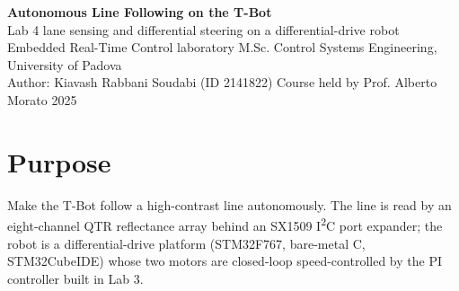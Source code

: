 \documentclass[10pt,a4paper]{article}
\begin{document}
\begin{center}
{\Large\bfseries Autonomous Line Following on the T-Bot}\\[2pt]
{\large Lab 4 \textendash{} lane sensing and differential steering on a differential-drive robot}\\[4pt]
{\small Embedded Real-Time Control laboratory \textendash{} M.Sc. Control Systems Engineering, University of Padova}\\
{\small Author: Kiavash Rabbani Soudabi (ID 2141822) \textendash{} Course held by Prof. Alberto Morato \textendash{} 2025}
\end{center}

\section*{Purpose}
Make the T-Bot follow a high-contrast line autonomously. The line is read by an eight-channel QTR
reflectance array behind an SX1509 I\textsuperscript{2}C port expander; the robot is a differential-drive
platform (STM32F767, bare-metal C, STM32CubeIDE) whose two motors are closed-loop speed-controlled by the
PI controller built in Lab 3.
\end{document}
